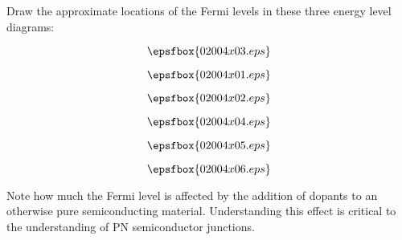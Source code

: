 

Draw the approximate locations of the Fermi levels in these three energy level diagrams:

$$\epsfbox{02004x03.eps}$$

$$\epsfbox{02004x01.eps}$$

$$\epsfbox{02004x02.eps}$$







$$\epsfbox{02004x04.eps}$$

$$\epsfbox{02004x05.eps}$$

$$\epsfbox{02004x06.eps}$$







Note how much the Fermi level is affected by the addition of dopants to an otherwise pure semiconducting material.  Understanding this effect is critical to the understanding of PN semiconductor junctions.




